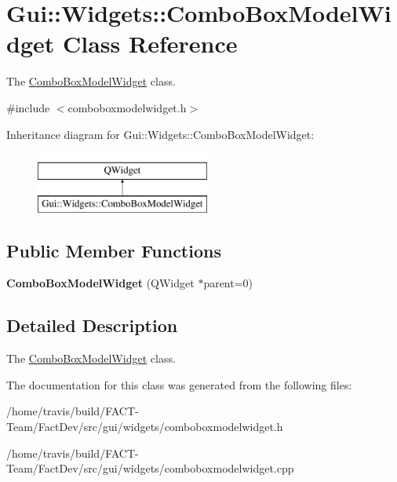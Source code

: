 \hypertarget{classGui_1_1Widgets_1_1ComboBoxModelWidget}{\section{Gui\-:\-:Widgets\-:\-:Combo\-Box\-Model\-Widget Class Reference}
\label{classGui_1_1Widgets_1_1ComboBoxModelWidget}
}


The \hyperlink{classGui_1_1Widgets_1_1ComboBoxModelWidget}{Combo\-Box\-Model\-Widget} class.  




{\ttfamily \#include $<$comboboxmodelwidget.\-h$>$}

Inheritance diagram for Gui\-:\-:Widgets\-:\-:Combo\-Box\-Model\-Widget\-:\begin{figure}[H]
\begin{center}
\leavevmode
\includegraphics[height=2.000000cm]{d2/de0/classGui_1_1Widgets_1_1ComboBoxModelWidget}
\end{center}
\end{figure}
\subsection*{Public Member Functions}
\begin{DoxyCompactItemize}
\item 
\hypertarget{classGui_1_1Widgets_1_1ComboBoxModelWidget_afeca0199adce7d17dc440e8fa546c9e5}{{\bfseries Combo\-Box\-Model\-Widget} (Q\-Widget $\ast$parent=0)}\label{classGui_1_1Widgets_1_1ComboBoxModelWidget_afeca0199adce7d17dc440e8fa546c9e5}

\end{DoxyCompactItemize}


\subsection{Detailed Description}
The \hyperlink{classGui_1_1Widgets_1_1ComboBoxModelWidget}{Combo\-Box\-Model\-Widget} class. 

The documentation for this class was generated from the following files\-:\begin{DoxyCompactItemize}
\item 
/home/travis/build/\-F\-A\-C\-T-\/\-Team/\-Fact\-Dev/src/gui/widgets/comboboxmodelwidget.\-h\item 
/home/travis/build/\-F\-A\-C\-T-\/\-Team/\-Fact\-Dev/src/gui/widgets/comboboxmodelwidget.\-cpp\end{DoxyCompactItemize}
